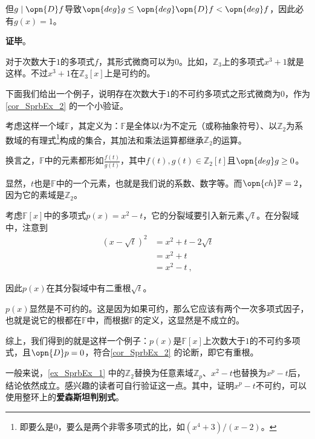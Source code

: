 但$g\mid \opn{D}f$导致$\opn{deg}g\leq\opn{deg}\opn{D}f<\opn{deg}f$，因此必有$g(x)=1$。



\textbf{证毕}。

对于次数大于$1$的多项式$f$，其形式微商可以为$0$。比如，$\mathbb{Z}_3$上的多项式$x^3+1$就是这样。不过$x^3+1$在$\mathbb{Z}_3[x]$上是可约的。

下面我们给出一个例子，说明存在次数大于$1$的不可约多项式之形式微商为$0$，作为\autoref{cor_SprbEx_2} 的一个小验证。





\begin{example}{}\label{ex_SprbEx_1}

考虑这样一个域$\mathbb{F}$，其定义为：$\mathbb{F}$是全体以$t$为不定元（或称抽象符号）、以$\mathbb{Z}_2$为系数域的有理式\footnote{即要么是$0$，要么是两个非零多项式的比，如$(x^4+3)/(x-2)$。}构成的集合，其加法和乘法运算都继承$\mathbb{Z}_2$的运算。

换言之，$\mathbb{F}$中的元素都形如$\frac{f(t)}{g(t)}$，其中$f(t), g(t)\in\mathbb{Z}_2[t]$且$\opn{deg}g\geq 0$。

显然，$t$也是$\mathbb{F}$中的一个元素，也就是我们说的系数、数字等。而$\opn{ch}\mathbb{F}=2$，因为它的素域是$\mathbb{Z}_2$。

考虑$\mathbb{F}[x]$中的多项式$p(x) = x^2-t$，它的分裂域要引入新元素$\sqrt{t}$。在分裂域中，注意到
\begin{equation}
\begin{aligned}
(x-\sqrt{t})^2&=x^2+t-2\sqrt{t}\\
&=x^2+t\\
&=x^2-t~,
\end{aligned}
\end{equation}

因此$p(x)$在其分裂域中有二重根$\sqrt{t}$。

$p(x)$显然是不可约的。这是因为如果可约，那么它应该有两个一次多项式因子，也就是说它的根都在$\mathbb{F}$中，而根据$\mathbb{F}$的定义，这显然是不成立的。

综上，我们得到的就是这样一个例子：$p(x)$是$\mathbb{F}[x]$上次数大于$1$的不可约多项式，且$\opn{D}p=0$，符合\autoref{cor_SprbEx_2} 的论断，即它有重根。

\end{example}

一般来说，\autoref{ex_SprbEx_1} 中的$\mathbb{Z}_2$替换为任意素域$\mathbb{Z}_p$、$x^2-t$也替换为$x^p-t$后，结论依然成立。感兴趣的读者可自行验证这一点。其中，证明$x^p-t$不可约，可以使用整环上的\textbf{爱森斯坦判别式}。

